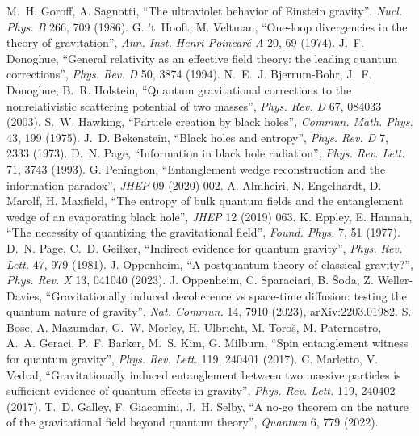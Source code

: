  M.~H. Goroff, A. Sagnotti, ``The ultraviolet behavior of Einstein gravity'', \emph{Nucl. Phys. B} 266, 709 (1986).
 G. 't~Hooft, M. Veltman, ``One-loop divergencies in the theory of gravitation'', \emph{Ann. Inst. Henri
Poincar\'e A} 20, 69 (1974).
 J.~F. Donoghue, ``General relativity as an effective field theory: the leading quantum corrections'', \emph{Phys. Rev.
D} 50, 3874 (1994).
 N.~E.~J. Bjerrum-Bohr, J.~F. Donoghue, B.~R. Holstein, ``Quantum gravitational corrections to the nonrelativistic
scattering potential of two masses'', \emph{Phys. Rev. D} 67, 084033 (2003).
 S.~W. Hawking, ``Particle creation by black holes'', \emph{Commun. Math. Phys.} 43, 199 (1975).
 J.~D. Bekenstein, ``Black holes and entropy'', \emph{Phys. Rev. D} 7, 2333 (1973).
 D.~N. Page, ``Information in black hole radiation'', \emph{Phys. Rev. Lett.} 71, 3743 (1993).
 G. Penington, ``Entanglement wedge reconstruction and the information paradox'', \emph{JHEP} 09 (2020) 002.
 A. Almheiri, N. Engelhardt, D. Marolf, H. Maxfield, ``The entropy of bulk quantum fields and the entanglement wedge of an
evaporating black hole'', \emph{JHEP} 12 (2019) 063.
 K. Eppley, E. Hannah, ``The necessity of quantizing the gravitational field'', \emph{Found. Phys.} 7, 51 (1977).
 D.~N. Page, C.~D. Geilker, ``Indirect evidence for quantum gravity'', \emph{Phys. Rev. Lett.} 47, 979 (1981).
 J. Oppenheim, ``A postquantum theory of classical gravity?'', \emph{Phys. Rev. X} 13, 041040 (2023).
 J. Oppenheim, C. Sparaciari, B. \v{S}oda, Z. Weller-Davies, ``Gravitationally induced decoherence vs space-time diffusion:
testing the quantum nature of gravity'', \emph{Nat. Commun.} 14, 7910 (2023), arXiv:2203.01982.
 S. Bose, A. Mazumdar, G.~W. Morley, H. Ulbricht, M. Toro\v{s}, M. Paternostro, A.~A. Geraci, P.~F. Barker, M.~S. Kim, G.
Milburn, ``Spin entanglement witness for quantum gravity'', \emph{Phys. Rev. Lett.} 119, 240401 (2017).
 C. Marletto, V. Vedral, ``Gravitationally induced entanglement between two massive particles is sufficient evidence of
quantum effects in gravity'', \emph{Phys. Rev. Lett.} 119, 240402 (2017).
 T.~D. Galley, F. Giacomini, J.~H. Selby, ``A no-go theorem on the nature of the gravitational field beyond quantum
theory'', \emph{Quantum} 6, 779 (2022).
